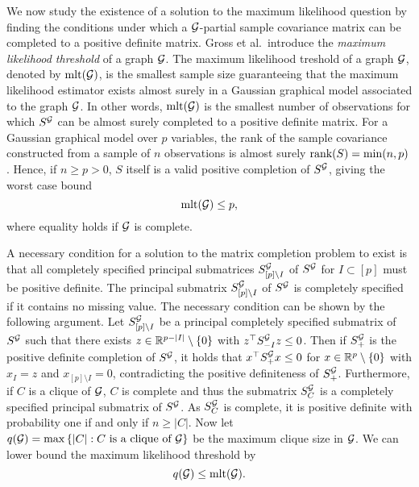 We now study the existence of a solution to the maximum likelihood question by finding the conditions under which a ${\mathcal{G}}$-partial sample covariance matrix can be completed to a positive definite matrix. Gross et al.\,\cite{10.3150/16-BEJ881} introduce the \textit{maximum likelihood threshold} of a graph ${\mathcal{G}}$. The maximum likelihood treshold of a graph ${\mathcal{G}}$, denoted by ${\textrm{mlt}}({\mathcal{G}})$, is the smallest sample size guaranteeing that the maximum likelihood estimator exists almost surely in a Gaussian graphical model associated to the graph ${\mathcal{G}}$. In other words, ${\textrm{mlt}}({\mathcal{G}})$ is the smallest number of observations for which $S^{\mathcal{G}}$ can be almost surely completed to a positive definite matrix. For a Gaussian graphical model over $p$ variables, the rank of the sample covariance constructed from a sample of $n$ observations is almost surely ${\textrm{rank}}(S) = \min(n, p)$. Hence, if $n \geq p > 0$, $S$ itself is a valid positive completion of $S^{\mathcal{G}}$, giving the worst case bound
\begin{equation} \label{eq-pessimistic-mlt}
    {\textrm{mlt}}({\mathcal{G}}) \leq p,
\end{equation}
where equality holds if ${\mathcal{G}}$ is complete.

A necessary condition for a solution to the matrix completion problem to exist is that all completely specified principal submatrices $S^{\mathcal{G}}_{[p]\setminus I}$ of $S^{\mathcal{G}}$ for $I \subset [p]$ must be positive definite. The principal submatrix $S^{\mathcal{G}}_{[p]\setminus I}$ of $S^{\mathcal{G}}$ is completely specified if it contains no missing value. The necessary condition can be shown by the following argument. Let $S^{\mathcal{G}}_{[p]\setminus I}$ be a principal completely specified submatrix of $S^{\mathcal{G}}$ such that there exists $z \in \mathbb{R}^{p-|I|}\setminus {\left\{0\right\}}$ with $z^\top S^{\mathcal{G}}_{-I} z \leq 0$. Then if $S^{\mathcal{G}}_+$ is the positive definite completion of $S^{\mathcal{G}}$, it holds that $x^\top S^{\mathcal{G}}_+ x \leq 0$ for $x \in \mathbb{R}^p \setminus {\left\{0\right\}}$ with $x_I = z$ and $x_{[p]\setminus I} = 0$, contradicting the positive definiteness of $S^{\mathcal{G}}_+$. Furthermore, if $C$ is a clique of ${\mathcal{G}}$, $C$ is complete and thus the submatrix $S^{\mathcal{G}}_C$ is a completely specified principal submatrix of $S^{\mathcal{G}}$. As $S^{\mathcal{G}}_C$ is complete, it is positive definite with probability one if and only if $n \geq |C|$. Now let $q({\mathcal{G}}) = \max {\left\{|C| : C {\textrm{ is a clique of }} {\mathcal{G}}\right\}}$ be the maximum clique size in ${\mathcal{G}}$. We can  lower bound the maximum likelihood threshold by
\begin{equation} \label{eq-mlt-upper-bound}
    q({\mathcal{G}}) \leq {\textrm{mlt}}({\mathcal{G}}).
\end{equation}

